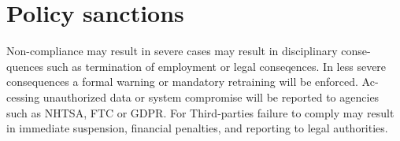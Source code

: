 \documentclass[12pt]{report}
\begin{document}
\section{Policy sanctions}

Non-compliance may result in severe cases may result in disciplinary conse-
quences such as termination of employment or legal conseqences. In less severe
consequences a formal warning or mandatory retraining will be enforced. Ac-
cessing unauthorized data or system compromise will be reported to agencies
such as NHTSA, FTC or GDPR. For Third-parties failure to comply may result
in immediate suspension, financial penalties, and reporting to legal authorities.
\end{document}
